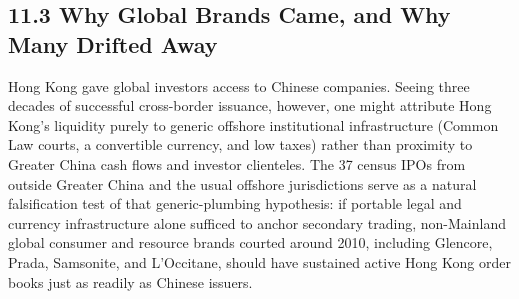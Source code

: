 \documentclass[11pt,letterpaper]{article}
\begin{document}
\subsection*{\texorpdfstring{11.3 Why Global Brands Came, and Why Many Drifted Away}{11.3 Why Global Brands Came, and Why Many Drifted Away}}
Hong Kong gave global investors access to Chinese companies. Seeing three decades of successful cross-border issuance, however, one might attribute Hong Kong's liquidity purely to generic offshore institutional infrastructure (Common Law courts, a convertible currency, and low taxes) rather than proximity to Greater China cash flows and investor clienteles. The 37 census IPOs from outside Greater China and the usual offshore jurisdictions serve as a natural falsification test of that generic-plumbing hypothesis: if portable legal and currency infrastructure alone sufficed to anchor secondary trading, non-Mainland global consumer and resource brands courted around 2010, including Glencore, Prada, Samsonite, and L'Occitane, should have sustained active Hong Kong order books just as readily as Chinese issuers.
\end{document}

